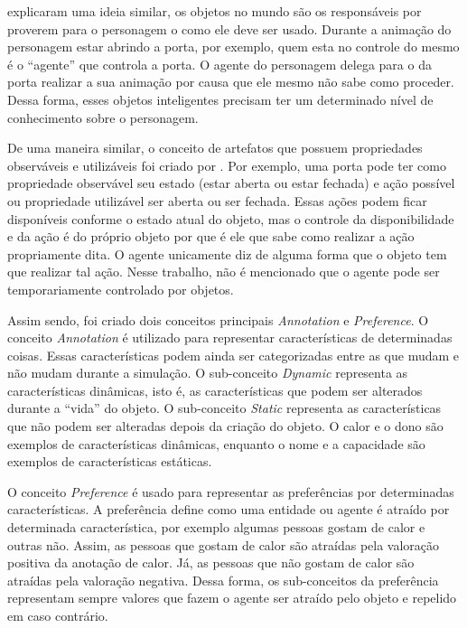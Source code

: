 \citet{kallmann1999modeling} explicaram uma ideia similar, os objetos no mundo
são os responsáveis por proverem para o personagem o como ele deve ser usado.
Durante a animação do personagem estar abrindo a porta, por exemplo, quem esta
no controle do mesmo é o ``agente'' que controla a porta. O agente do
personagem delega para o da porta realizar a sua animação por causa que ele
mesmo não sabe como proceder. Dessa forma, esses objetos inteligentes
precisam ter um determinado nível de conhecimento sobre o personagem.

De uma maneira similar, o conceito de artefatos que possuem propriedades
observáveis e utilizáveis foi criado por \citet{ricci31cartago}. Por exemplo,
uma porta pode ter como propriedade observável seu estado (estar aberta ou
estar fechada) e ação possível ou propriedade utilizável ser aberta ou ser
fechada. Essas ações podem ficar disponíveis conforme o estado atual do
objeto, mas o controle da disponibilidade e da ação é do próprio objeto por
que é ele que sabe como realizar a ação propriamente dita. O agente unicamente
diz de alguma forma que o objeto tem que realizar tal ação. Nesse trabalho,
não é mencionado que o agente pode ser temporariamente controlado por
objetos.

Assim sendo, foi criado dois conceitos principais \emph{Annotation} e
\emph{Preference}. O conceito \emph{Annotation} é utilizado para representar
características de determinadas coisas. Essas características podem ainda
ser categorizadas entre as que mudam e não mudam durante a simulação. O
sub-conceito \emph{Dynamic} representa as características dinâmicas, isto é,
as características que podem ser alterados durante a ``vida'' do objeto. O
sub-conceito \emph{Static} representa as características que não podem ser
alteradas depois da criação do objeto. O calor e o dono são exemplos de
características dinâmicas, enquanto o nome e a capacidade são exemplos de
características estáticas.

O conceito \emph{Preference} é usado para representar as preferências por
determinadas características. A preferência define como uma entidade ou
agente é atraído por determinada característica, por exemplo algumas pessoas
gostam de calor e outras não. Assim, as pessoas que gostam de calor são
atraídas pela valoração positiva da anotação de calor. Já, as pessoas que não
gostam de calor são atraídas pela valoração negativa. Dessa forma, os
sub-conceitos da preferência representam sempre valores que fazem o agente ser
atraído pelo objeto e repelido em caso contrário.

